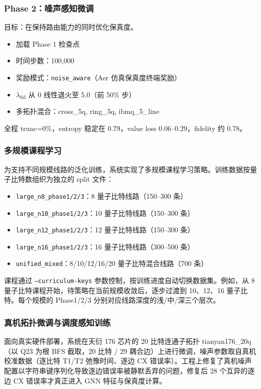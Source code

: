 \subsubsection{Phase 2：噪声感知微调}

目标：在保持路由能力的同时优化保真度。
\begin{itemize}
  \item 加载 Phase 1 检查点
  \item 时间步数：100,000
  \item 奖励模式：\texttt{noise\_aware}（Aer 仿真保真度终端奖励）
  \item $\lambda_{\text{fid}}$ 从 0 线性退火至 5.0（前 50\% 步）
  \item 多拓扑混合：cross\_5q, ring\_5q, ibmq\_5\_line
\end{itemize}

全程 trunc=0\%，entropy 稳定在 0.79，value loss 0.06--0.29，fidelity 约 0.78。

\subsubsection{多规模课程学习}

为支持不同规模线路的泛化训练，系统实现了多规模课程学习策略。训练数据按量子比特数组织为独立的 split 文件：

\begin{itemize}
  \item \texttt{large\_n8\_phase1/2/3}：8 量子比特线路（150--300 条）
  \item \texttt{large\_n10\_phase1/2/3}：10 量子比特线路（150--300 条）
  \item \texttt{large\_n12\_phase1/2/3}：12 量子比特线路（150--300 条）
  \item \texttt{large\_n16\_phase1/2/3}：16 量子比特线路（300--500 条）
  \item \texttt{unified\_mixed}：8/10/12/16/20 量子比特混合线路（700 条）
\end{itemize}

课程通过 \texttt{--curriculum-keys} 参数控制，按训练进度自动切换数据集。例如，从 8 量子比特课程开始，待策略在当前规模收敛后，逐步过渡到 10、12、16 量子比特。每个规模的 Phase1/2/3 分别对应线路深度的浅/中/深三个层次。

\subsubsection{真机拓扑微调与调度感知训练}

面向真实硬件部署，系统在天衍 176 芯片的 20 比特连通子拓扑 tianyan176\_20q（以 Q23 为根 BFS 截取，20 比特 / 29 耦合边）上进行微调，噪声参数取自真机校准数据（逐比特 T1/T2 弛豫时间、逐边 CX 错误率）。工程上修复了真机噪声配置以字符串键序列化导致逐边错误率被静默丢弃的问题，修复后 28 个互异的逐边 CX 错误率才真正进入 GNN 特征与保真度计算。


